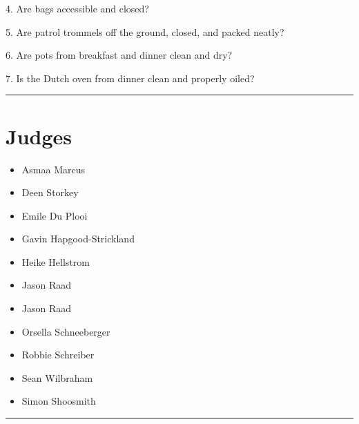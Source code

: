 \documentclass[10pt]{article}
\begin{document}
4. Are bags accessible and closed?

5. Are patrol trommels off the ground, closed, and packed neatly?

6. Are pots from breakfast and dinner clean and dry?

7. Is the Dutch oven from dinner clean and properly oiled?
\vspace{0.5cm}
	\hrule
	\vspace{0.5cm}
		\section*{\faUsers \: Judges}

		

	\begin{multicols}{2}

		\begin{itemize}
									\item Asmaa Marcus
									\item Deen Storkey
									\item Emile Du Plooi
									\item Gavin Hapgood-Strickland
									\item Heike Hellstrom
									\item Jason Raad
						\end{itemize}

		\vfill\null
		\columnbreak

		\begin{itemize}
									\item Jason Raad
									\item Orsella Schneeberger
									\item Robbie Schreiber
									\item Sean Wilbraham
									\item Simon Shoosmith
						\end{itemize}

		\vfill\null

		\end{multicols}



			\vspace{0.5cm}
	\hrule
	\vspace{0.5cm}
\end{document}
